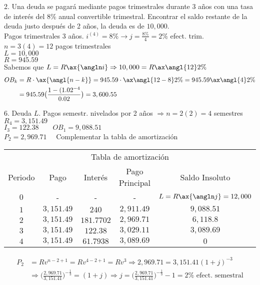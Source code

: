 2. Una deuda se pagará mediante pagos trimestrales durante 3 años con una tasa de interés del 8\% anual convertible trimestral. Encontrar el saldo restante de la deuda justo después de 2 años, la deuda es de $10,000$.\\
Pagos trimestrales 3 años. $i^{(4)}= 8\% \to j=\frac{8\%}{4}=2\%$ efect. trim.\\
$n=3(4) = 12$ pagos trimestrales\\
$L=10,000$\\
$R=945.59$\\
Sabemos que $L=R\ax{\angln i} \Rightarrow 10,000 = R\ax{\angl{12}2\%}$\\
\begin{align*}
    OB_k &= R\cdot\ax{\angl{n-k}} =945.59\cdot\ax{\angl{12-8}2\%} = 945.59\ax{\angl{4}2\%}\\
    &= 945.59\big(\frac{1-(1.02^{-4}}{0.02}\big) = 3,600.55
\end{align*}

6. Deuda $L$. Pagos semestr. nivelados por 2 años $\Rightarrow n=2(2) = 4$ semestres\\
$R_4 = 3,151.49$\\
$I_3 = 122.38\quad\quad OB_1 = 9,088.51$\\
$P_2= 2,969.71 \quad$ Complementar la tabla de amortización 

\begin{table}[h]
\begin{tabular}{c|c|c|c|c}
\multicolumn{5}{c}{Tabla de amortización}                                        \\
Periodo & Pago       & Interés    & Pago Principal & Saldo Insoluto              \\
$0$     & -          & -          & -              & $L=R\ax{\angln j} = 12,000$ \\
$1$     & $3,151.49$ & $240$      & $2,911.49$     & $9,088.51$                  \\
$2$     & $3,151.49$ & $181.7702$ & $2,969.71$     & $6,118.8$                   \\
$3$     & $3,151.49$ & $122.38$   & $3,029.11$     & $3,089.69$                  \\
$4$     & $3,151.49$ & $61.7938$  & $3,089.69$     & $0$
\end{tabular}
\end{table}

\begin{align*}
    P_2 &= Rv^{n-2+1} = Rv^{4-2+1} = Rv^3 \Rightarrow 2,969.71 = 3,151.41(1+j)^{-3}\\
    & \Rightarrow \bigg(\frac{2,969.71}{3,151.41}\bigg)^{-\frac{1}{3}} = (1+j) \Rightarrow j = \bigg(\frac{2,969.71}{3,151.41}\bigg)^{-\frac{1}{3}} - 1 = 2\% \text{ efect. semestral}
\end{align*}

